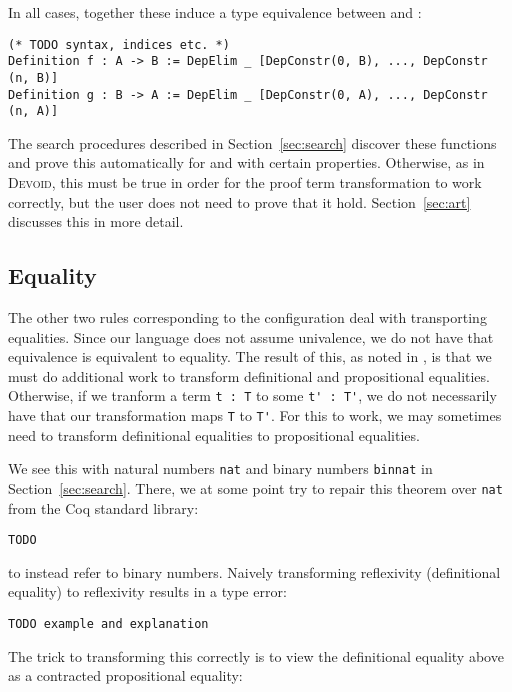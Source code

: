 In all cases, together these induce a type equivalence between \A and \B:

\begin{lstlisting}
(* TODO syntax, indices etc. *)
Definition f : A -> B := DepElim _ [DepConstr(0, B), ..., DepConstr (n, B)]
Definition g : B -> A := DepElim _ [DepConstr(0, A), ..., DepConstr (n, A)]
\end{lstlisting}
The search procedures described in Section~\ref{sec:search} discover these functions and prove this automatically
for \A and \B with certain properties.
Otherwise, as in \textsc{Devoid}, this must be true in order for the proof term transformation
to work correctly, but the user does not need to prove that it hold.
Section~\ref{sec:art} discusses this in more detail.

\subsection{Equality}
\label{sec:equality}

The other two rules corresponding to the configuration deal with transporting equalities.
Since our language does not assume univalence, we do not have that equivalence is equivalent to equality.
The result of this, as noted in \citet{tabareau2019marriage},
is that we must do additional work to transform definitional and propositional equalities.
Otherwise, if we tranform a term \lstinline{t : T} to some \lstinline{t' : T'}, we do not necessarily
have that our transformation maps \lstinline{T} to \lstinline{T'}.
For this to work, we may sometimes need to transform definitional equalities to propositional equalities.

We see this with natural numbers \lstinline{nat} and binary numbers \lstinline{binnat}
in Section~\ref{sec:search}.
There, we at some point try to repair this theorem over \lstinline{nat} from the Coq standard library:

\begin{lstlisting}
TODO
\end{lstlisting}
to instead refer to binary numbers.
Naively transforming reflexivity (definitional equality) to reflexivity results in a type error:

\begin{lstlisting}
TODO example and explanation
\end{lstlisting}
The trick to transforming this correctly is to view the definitional equality above as a contracted propositional equality:

